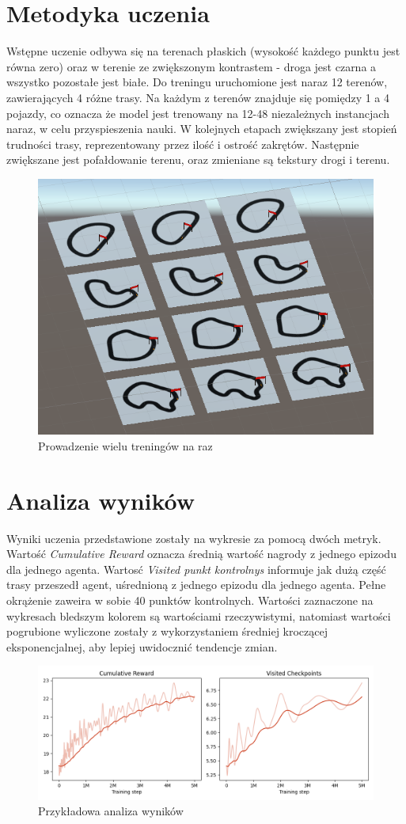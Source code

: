 \section{Metodyka uczenia}
Wstępne uczenie odbywa się na terenach płaskich (wysokość każdego punktu jest równa zero) oraz w terenie ze zwiększonym kontrastem - droga jest czarna a wszystko pozostałe jest białe. Do treningu uruchomione jest naraz 12 terenów, zawierających 4 różne trasy. Na każdym z terenów znajduje się pomiędzy 1 a 4 pojazdy, co oznacza że model jest trenowany na 12-48 niezależnych instancjach naraz, w celu przyspieszenia nauki. W kolejnych etapach zwiększany jest stopień trudności trasy, reprezentowany przez ilość i ostrość zakrętów. Następnie zwiększane jest pofałdowanie terenu, oraz zmieniane są tekstury drogi i terenu.
\begin{figure}[H]
    \centering
    \includegraphics[width=.5\textwidth]{figures/multiple_tests}
    \caption{Prowadzenie wielu treningów na raz}
    \label{fig}
\end{figure}

\section{Analiza wyników}
Wyniki uczenia przedstawione zostały na wykresie za pomocą dwóch metryk. Wartość \textit{Cumulative Reward} oznacza średnią wartość nagrody z jednego epizodu dla jednego agenta. Wartosć \textit{Visited punkt kontrolnys} informuje jak dużą część trasy przeszedł agent, uśrednioną z jednego epizodu dla jednego agenta. Pełne okrążenie zaweira w sobie 40 punktów kontrolnych. Wartości zaznaczone na wykresach bledszym kolorem są wartościami rzeczywistymi, natomiast wartości pogrubione wyliczone zostały z wykorzystaniem średniej kroczącej eksponencjalnej, aby lepiej uwidocznić tendencje zmian.

\begin{figure}[H]
    \centering
    \includegraphics[width=\textwidth]{graphs/example}
    \caption{Przykładowa analiza wyników}
    \label{fig}
\end{figure}


